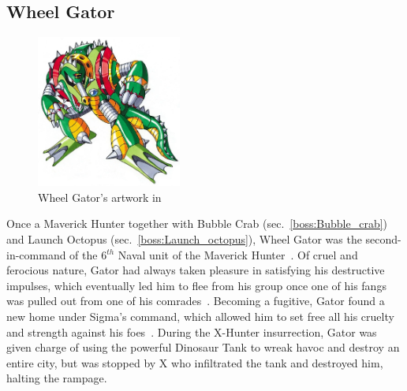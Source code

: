 \subsection{Wheel Gator}\label{boss:Wheel_gator}
\begin{figure}[htp]
	\centering
	\includegraphics[height=5cm]{figures/X2/Wheel_gator/Wheel_Gator.png}
	\caption{Wheel Gator's artwork in \cite{book:MMX_Complete_art}}
\end{figure}
Once a Maverick Hunter together with Bubble Crab (sec.~\ref{boss:Bubble_crab}) and Launch Octopus (sec.~\ref{boss:Launch_octopus}), Wheel Gator was the second-in-command  of the 6$^{th}$ Naval unit of the Maverick Hunter~\cite{Xcoll1:Manual_X2}. Of cruel and ferocious nature, Gator had always taken pleasure in satisfying his destructive impulses, which eventually led him to flee from his group once one of his fangs was pulled out from one of his comrades~\cite{wayback:X2_resources}. Becoming a fugitive, Gator found a new home under Sigma's command, which allowed him to set free all his cruelty and strength against his foes~\cite{wiki:Wheel_gator}. During the X-Hunter insurrection, Gator was given charge of using the powerful Dinosaur Tank to wreak havoc and destroy an entire city, but was stopped by X who infiltrated the tank and destroyed him, halting the rampage.


